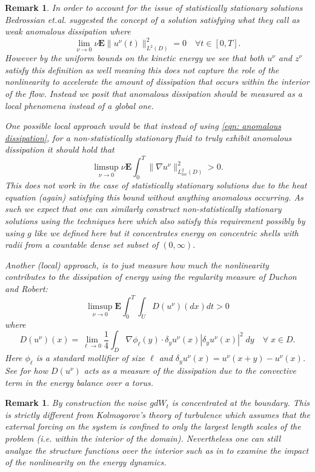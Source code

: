 \documentclass[11pt, reqno]{article}
\newtheorem{remark}[theorem]{Remark}
\def\grad{\nabla}
\def\E{\mathbf{E}}
\begin{document}
\begin{remark}\label{remark: local anomalous dissipation}
   In order to account for the issue of statistically stationary solutions Bedrossian et.al. \cite{bedrossian2019sufficient} suggested the concept of a solution satisfying what they call as weak anomalous dissipation where
   \[   
        \lim_{\nu \to 0}\nu\E\|u^\nu(t)\|_{L^2(D)}^2 = 0 \quad \forall t \in [0, T].
   \]
   However by the uniform bounds on the kinetic energy we see that both $u^\nu$ and $z^\nu$ satisfy this definition as well meaning this does not capture the role of the nonlinearity to accelerate the amount of dissipation that occurs within the interior of the flow. Instead we posit that anomalous dissipation should be measured as a local phenomena instead of a global one. 
   
   One possible local approach would be that instead of using \eqref{eqn: anomalous dissipation}, for a non-statistically stationary fluid to truly exhibit anomalous dissipation it should hold that 
   \[
        \limsup_{\nu \to 0}\nu\E\int_0^T\|\grad u^\nu\|_{L_{loc}^2(D)}^2 > 0.
   \]
   This does not work in the case of statistically stationary solutions due to the heat equation (again) satisfying this bound without anything anomalous occurring. As such we expect that one can similarly construct non-statistically stationary solutions using the techniques here which also satisfy this requirement possibly by using $g$ like we defined here but it concentrates energy on concentric shells with radii from a countable dense set subset of $(0, \infty)$.
   
   Another (local) approach, is to just measure how much the nonlinearity contributes to the dissipation of energy using the regularity measure of Duchon and Robert\cite{duchon2000inertial}:
   \[
        \limsup_{\nu \to 0}\E\int_0^T\int_U D(u^\nu)(dx)dt > 0
   \]
   where 
   \[
        D(u^\nu)(x) = \lim_{\ell \to 0} \frac{1}{4}\int_{D} \grad \phi_\ell(y)\cdot \delta_y u^\nu(x) |\delta_y u^\nu(x)|^2\;dy \quad \forall \; x \in D.
   \]
   Here $\phi_\ell$ is a standard mollifier of size $\ell$ and $\delta_y u^\nu(x) = u^\nu(x+y) - u^\nu(x)$. See \cites{duchon2000inertial, dudley2024necessary} for how $D(u^\nu)$ acts as a measure of the dissipation due to the convective term in the energy balance over a torus. 
\end{remark}
\begin{remark}
    By construction the noise $gdW_t$ is concentrated at the boundary. This is strictly different from Kolmogorov's theory of turbulence which assumes that the external forcing on the system is confined to only the largest length scales of the problem (i.e. within the interior of the domain). Nevertheless one can still analyze the structure functions over the interior such as in \cite{papathanasiou2021sufficient} to examine the impact of the nonlinearity on the energy dynamics. 
\end{remark}
\end{document}
